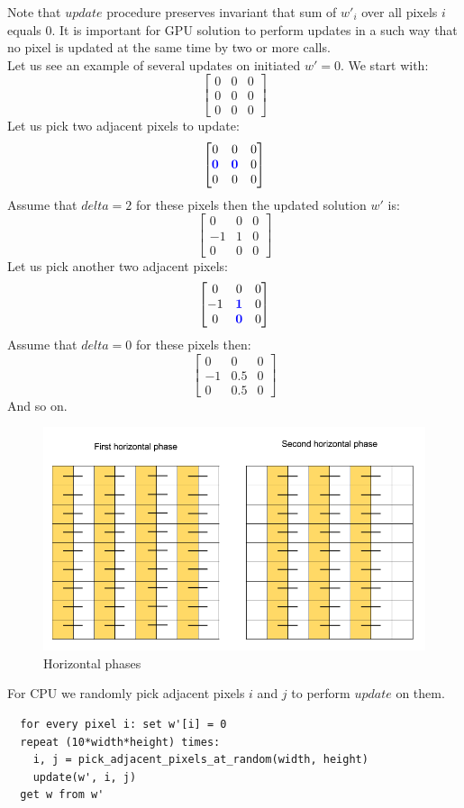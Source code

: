 \documentclass[a4paper,12pt]{article}
\begin{document}
Note that $update$ procedure preserves invariant that sum of $w'_i$ over all
pixels $i$ equals $0$. It is important for GPU solution to perform updates in a such
way that no pixel is updated at the same time by two or more calls.\\
Let us see an example of several updates on initiated $w' = 0$. We start with:\\
$$\begin{bmatrix}
0 & 0 & 0\\
0 & 0 & 0\\
0 & 0 & 0
\end{bmatrix}$$
Let us pick two adjacent pixels to update:
$$\begin{bmatrix}
0 & 0 & 0\\
\textbf{\color{blue} 0} & \textbf{\color{blue} 0} & 0\\
0 & 0 & 0
\end{bmatrix}$$
Assume that $delta = 2$ for these pixels then the updated solution $w'$ is:
$$\begin{bmatrix}
0 & 0 & 0\\
-1 & 1 & 0\\
0 & 0 & 0
\end{bmatrix}$$
Let us pick another two adjacent pixels:
$$\begin{bmatrix}
0 & 0 & 0\\
-1 & \textbf{\color{blue} 1} & 0\\
0 & \textbf{\color{blue} 0} & 0
\end{bmatrix}$$
Assume that $delta = 0$ for these pixels then:
$$\begin{bmatrix}
0 & 0 & 0\\
-1 & 0.5 & 0\\
0 & 0.5 & 0
\end{bmatrix}$$
And so on.\\
\begin{figure}[ht]
  \centering
    \includegraphics[width=1.0\textwidth]{../../images/horizontal-phases.png}
  \caption{Horizontal phases}
  \label{schema:horizontal-phases}
\end{figure}
For CPU we randomly pick adjacent pixels $i$ and $j$ to
perform $update$ on them. 
\begin{lstlisting}
  for every pixel i: set w'[i] = 0
  repeat (10*width*height) times:
    i, j = pick_adjacent_pixels_at_random(width, height)
    update(w', i, j)
  get w from w'
\end{lstlisting}
\end{document}
